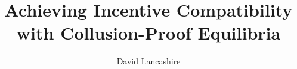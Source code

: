 \documentclass[11pt,a4paper]{llncs}
\begin{document}

\title{\LARGE{Achieving Incentive Compatibility with Collusion-Proof Equilibria}}


%
%
\author{\large{David Lancashire}}


%
%
%
%
%
%

\maketitle

\thispagestyle{firstpage}
\end{document}
